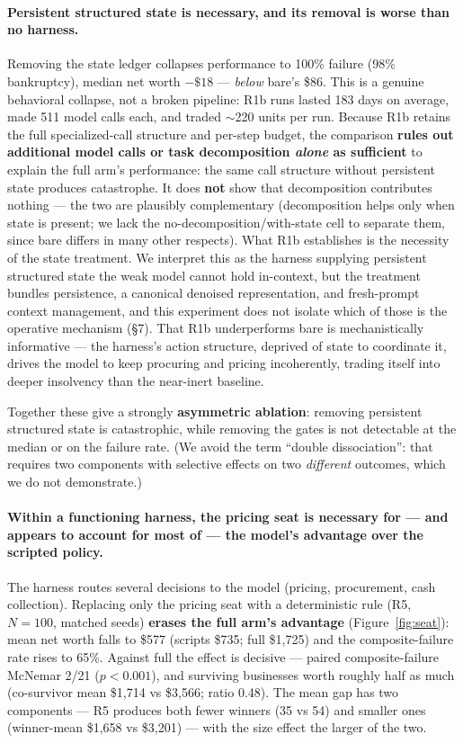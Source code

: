 \documentclass[11pt]{article}
\begin{document}
\paragraph{Persistent structured state is necessary, and its removal is worse
than no harness.} Removing the state ledger collapses performance to 100\%
failure (98\% bankruptcy), median net worth $-\$18$ --- \emph{below} bare's
\$86. This is a genuine behavioral collapse, not a broken pipeline: R1b runs
lasted 183 days on average, made 511 model calls each, and traded $\sim$220
units per run. Because R1b retains the full specialized-call structure and
per-step budget, the comparison \textbf{rules out additional model calls or
task decomposition \emph{alone} as sufficient} to explain the full arm's
performance: the same call structure without persistent state produces
catastrophe. It does \textbf{not} show that decomposition contributes nothing
--- the two are plausibly complementary (decomposition helps only when state is
present; we lack the no-decomposition/with-state cell to separate them, since
bare differs in many other respects). What R1b establishes is the necessity of
the state treatment. We interpret this as the harness supplying persistent
structured state the weak model cannot hold in-context, but the treatment
bundles persistence, a canonical denoised representation, and fresh-prompt
context management, and this experiment does not isolate which of those is the
operative mechanism (\S7). That R1b underperforms bare is mechanistically
informative --- the harness's action structure, deprived of state to coordinate
it, drives the model to keep procuring and pricing incoherently, trading itself
into deeper insolvency than the near-inert baseline.

Together these give a strongly \textbf{asymmetric ablation}: removing
persistent structured state is catastrophic, while removing the gates is not
detectable at the median or on the failure rate. (We avoid the term ``double
dissociation'': that requires two components with selective effects on two
\emph{different} outcomes, which we do not demonstrate.)

\paragraph{Within a functioning harness, the pricing seat is necessary for ---
and appears to account for most of --- the model's advantage over the scripted
policy.} The harness routes several decisions to the model (pricing,
procurement, cash collection). Replacing only the pricing seat with a
deterministic rule (R5, $N=100$, matched seeds) \textbf{erases the full arm's
advantage} (Figure~\ref{fig:seat}): mean net worth falls to \$577 (scripts
\$735; full \$1,725) and the composite-failure rate rises to 65\%. Against full
the effect is decisive --- paired composite-failure McNemar 2/21 ($p<0.001$),
and surviving businesses worth roughly half as much (co-survivor mean \$1,714 vs
\$3,566; ratio 0.48). The mean gap has two components --- R5 produces both fewer
winners (35 vs 54) and smaller ones (winner-mean \$1,658 vs \$3,201) --- with the
size effect the larger of the two.
\end{document}
